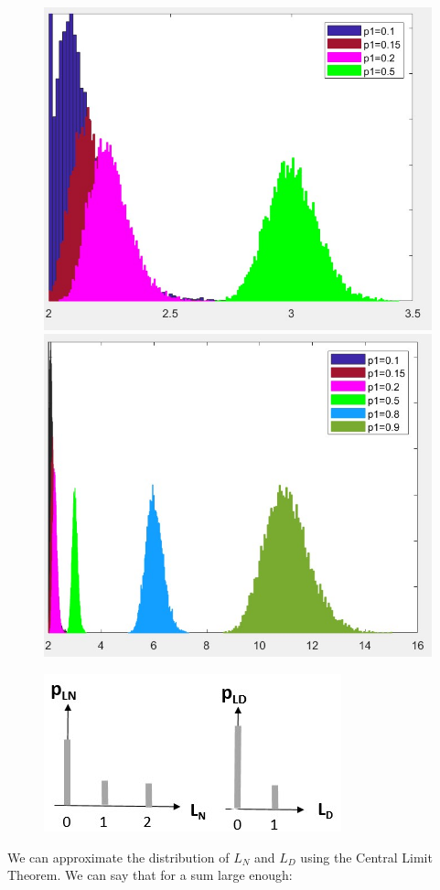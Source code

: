 \documentclass[lettersize,journal]{IEEEtran}
\begin{document}
\begin{figure}[htbp]
    \centerline{\includegraphics[width=0.7\columnwidth]{pdfL_func_p1.jpg}}
        \centerline{\includegraphics[width=0.7\columnwidth]{pdfL_func_p1_a0p9.jpg}}
    \caption{ }
    \label{pdf_L}
\end{figure}


\begin{figure}[htbp]
    \centerline{\includegraphics[width=0.7\columnwidth]{PDF_nyd.jpg}}
    \caption{ }
    \label{fig:NyD}
\end{figure}

We can approximate the distribution of $L_N$ and $L_D$ using the Central Limit Theorem. We can say that for a sum large enough: 
\end{document}
